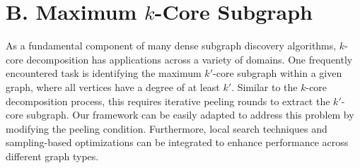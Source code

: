 \clearpage
\label{sec:appendix}


% 


\section*{B. Maximum $k$-Core Subgraph}

As a fundamental component of many dense subgraph discovery algorithms, $k$-core decomposition has applications across a variety of domains. 
One frequently encountered task is identifying the maximum $k'$-core subgraph within a given graph, where all vertices have a degree of at least $k'$. Similar to the $k$-core decomposition process, this requires iterative peeling rounds to extract the $k'$-core subgraph. 
Our framework can be easily adapted to address this problem by modifying the peeling condition. Furthermore, local search techniques and sampling-based optimizations can be integrated to enhance performance across different graph types.

